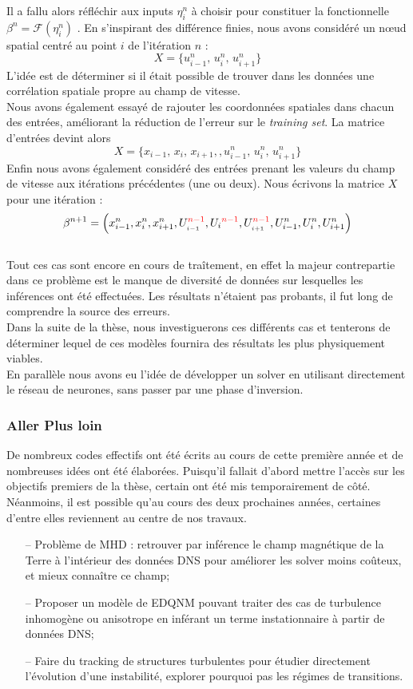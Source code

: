 \documentclass[a4paper,12pt]{article}
\newcommand{\bepar}[1]{
	\left( #1 \right)  
}
\newcommand\bk{\color{black}}
\newcommand\dsb{\color{dsb}}
\newcommand\red{\color{red}}
\numberwithin{equation}{section} %
\begin{document}
\noindent Il a fallu alors réfléchir aux inputs $\eta_i^n$ à choisir pour constituer la fonctionnelle $\beta^n = \mathcal{F}\bepar{\eta_i^n}$ . En s'inspirant des différence finies, nous avons considéré un nœud spatial centré au point $i$ de l'itération $n$ : $$X = \{ u^n_{i-1},\, u^n_{i},\, u^n_{i+1}\}$$ L'idée est de déterminer si il était possible de trouver dans les données une corrélation spatiale propre au champ de vitesse.\\
Nous avons également essayé de rajouter les coordonnées spatiales dans chacun des entrées, améliorant la réduction de l'erreur sur le \textit{training set}. La matrice d'entrées devint alors $$X = \{ x_{i-1}, \, x_i,\, x_{i+1},, u^n_{i-1},\, u^n_{i},\, u^n_{i+1}\}$$
Enfin nous avons également considéré des entrées prenant les valeurs du champ de vitesse aux itérations précédentes (une ou deux). Nous écrivons la matrice $X$ pour une itération : $$ \beta^{n+1} = \bepar{x_{i-1}^n, x_i^n, x^n_{i+1}, U_{_{\bk i-1}}^{\red n-1}, U_{\bk i}^{\red n-1}, U_{_{\bk i+1}}^{\red n-1}, U_{i-1}^n, U_i^n, U^n_{i+1}} $$\\
Tout ces cas sont encore en cours de traîtement, en effet la majeur contrepartie dans ce problème est le manque de diversité de données sur lesquelles les inférences ont été effectuées. Les résultats n'étaient pas probants, il fut long de comprendre la source des erreurs. \\
Dans la suite de la thèse, nous investiguerons ces différents cas et tenterons de déterminer lequel de ces modèles fournira des résultats les plus physiquement viables.\\
En parallèle nous avons eu l'idée de développer un solver en utilisant directement le réseau de neurones, sans passer par une phase d'inversion.\\

\dsb \subsubsection{Aller Plus loin} \bk
\noindent De nombreux codes effectifs ont été écrits au cours de cette première année et de nombreuses idées ont été élaborées. Puisqu'il fallait d'abord mettre l'accès sur les objectifs premiers de la thèse, certain ont été mis temporairement de côté.\\
 Néanmoins, il est possible qu'au cours des deux prochaines années, certaines d'entre elles reviennent au centre de nos travaux.
 \begin{itemize}[leftmargin=1cm]
 \item[--] Problème de MHD : retrouver par inférence le champ magnétique de la Terre à l'intérieur des données DNS pour améliorer les solver moins coûteux, et mieux connaître ce champ;
 \item[--] Proposer un modèle de EDQNM pouvant traiter des cas de turbulence inhomogène ou anisotrope en inférant un terme instationnaire à partir de données DNS;
 \item[--] Faire du tracking de structures turbulentes pour étudier directement l'évolution d'une instabilité, explorer pourquoi pas les régimes de transitions.
 \end{itemize}
\end{document}
